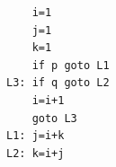 \documentclass{jarticle}
\begin{document}
\begin{Verbatim}
    i=1
    j=1
    k=1
    if p goto L1
L3: if q goto L2
    i=i+1
    goto L3
L1: j=i+k
L2: k=i+j
\end{Verbatim}
\end{document}

